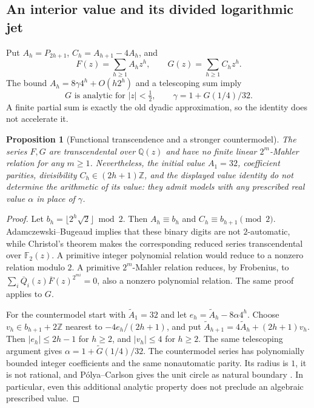 \documentclass[11pt,a4paper]{article}
\newcommand{\Q}{\mathbb Q}
\newcommand{\Z}{\mathbb Z}
\newtheorem{proposition}[theorem]{Proposition}
\theoremstyle{definition}
\theoremstyle{remark}
\numberwithin{equation}{section}
\begin{document}
\subsection{An interior value and its divided logarithmic jet}
Put $A_h=P_{2h+1}$, $C_h=A_{h+1}-4A_h$, and
\[
 F(z)=\sum_{h\ge1}A_hz^h,\qquad G(z)=\sum_{h\ge1}C_hz^h.
\]
The bound $A_h=8\gamma4^h+O(h2^h)$ and a telescoping sum imply
\begin{equation}\label{ar:interiorvalue}
 G\text{ is analytic for }|z|<\tfrac12,\qquad
 \gamma=1+G(1/4)/32.
\end{equation}
A finite partial sum is exactly the old dyadic approximation, so the
identity does not accelerate it.

\begin{proposition}[Functional transcendence and a stronger countermodel]
\label{ar:functioncounter}
The series $F,G$ are transcendental over $\Q(z)$ and have no finite
linear $2^m$-Mahler relation for any $m\ge1$.  Nevertheless, the initial
value $A_1=32$, coefficient parities, divisibility
$C_h\in(2h+1)\Z$, and the displayed value identity do not determine the
arithmetic of its value: they admit models with any prescribed real value
$\alpha$ in place of $\gamma$.
\end{proposition}
\begin{proof}
Let $b_h=\lfloor2^h\sqrt2\rfloor\bmod2$.  Then
$A_h\equiv b_h$ and $C_h\equiv b_{h+1}\pmod2$.
Adamczewski--Bugeaud \cite{ar:AB} implies that these binary digits are not
$2$-automatic, while Christol's theorem \cite{ar:Christol} makes the
corresponding reduced series transcendental over $\mathbb F_2(z)$.
A primitive integer polynomial relation would reduce to a nonzero relation
modulo $2$.  A primitive $2^m$-Mahler relation reduces, by Frobenius, to
$\sum_i\overline Q_i(z)\overline F(z)^{2^{mi}}=0$, also a nonzero
polynomial relation.  The same proof applies to $G$.

For the countermodel start with $\widetilde A_1=32$ and let
$e_h=\widetilde A_h-8\alpha4^h$.  Choose
$v_h\in b_{h+1}+2\Z$ nearest to $-4e_h/(2h+1)$, and put
$\widetilde A_{h+1}=4\widetilde A_h+(2h+1)v_h$.
Then $|e_h|\le2h-1$ for $h\ge2$, and $|v_h|\le4$ for $h\ge2$.
The same telescoping argument gives
$\alpha=1+\widetilde G(1/4)/32$.
The countermodel series has polynomially bounded integer coefficients and
the same nonautomatic parity.  Its radius is $1$, it is not rational,
and P\'olya--Carlson gives the unit circle as natural boundary
\cite{ar:PolyaCarlson}.  In particular, even this additional analytic
property does not preclude an algebraic prescribed value.
\end{proof}
\end{document}
